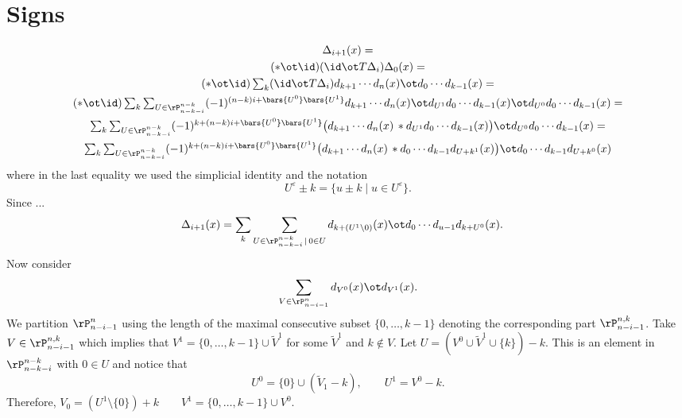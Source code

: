 
\section{Signs}

\begin{gather*}
	\Delta_{i+1}(x) = \\
	(\ast \ot \id)(\id \ot T\Delta_i) \Delta_0(x) = \\
	(\ast \ot \id) \textstyle\sum_k (\id \ot T\Delta_i) d_{k+1} \dotsm d_n(x) \ot d_{0} \dotsm d_{k-1}(x) = \\
	(\ast \ot \id)\textstyle\sum_k \sum_{U \in \rP^{n-k}_{n-k-i}} (-1)^{(n-k)i+\bars{U^0}\bars{U^1}} d_{k+1} \dotsm d_n(x) \ot d_{U^1} d_{0} \dotsm d_{k-1}(x) \ot d_{U^0} d_{0} \dotsm d_{k-1}(x) = \\
	\textstyle\sum_k \sum_{U \in \rP^{n-k}_{n-k-i}} (-1)^{k+(n-k)i+\bars{U^0}\bars{U^1}} \big( d_{k+1} \dotsm d_n(x) \, \ast d_{U^1} d_{0} \dotsm d_{k-1}(x) \big) \ot d_{U^0} d_{0} \dotsm d_{k-1}(x) = \\
	\textstyle\sum_k \sum_{U \in \rP^{n-k}_{n-k-i}} (-1)^{k+(n-k)i+\bars{U^0}\bars{U^1}} \big( d_{k+1} \dotsm d_n(x) \, \ast d_{0} \dotsm d_{k-1} d_{U+k^1}(x) \big) \ot d_{0} \dotsm d_{k-1} d_{U+k^0}(x)
\end{gather*}
where in the last equality we used the simplicial identity and the notation
\[
U^\varepsilon \pm k = \{u \pm k \mid u \in U^\varepsilon\}.
\]
Since ...
\begin{align*}
	\Delta_{i+1}(x) &=
	\sum_k \sum_{U \in \rP^{n-k}_{n-k-i} \,|\, 0 \in U} d_{k+(U^1 \setminus 0)}(x) \ot d_{0} \dotsm d_{u-1} d_{k+U^0}(x).
\end{align*}
Now consider
\[
\sum_{V \in \rP^{n}_{n-i-1}} d_{V^0}(x) \ot d_{V^1}(x).
\]
We partition $\rP^{n}_{n-i-1}$ using the length of the maximal consecutive subset $\{0,\dots,k-1\}$ denoting the corresponding part $\rP^{n,k}_{n-i-1}$.
Take $V \in \rP^{n,k}_{n-i-1}$ which implies that $V^1 = \{0,\dots,k-1\} \cup \widetilde V^1$ for some $\widetilde V^1$ and $k \notin V$.
Let $U = (V^0 \cup \widetilde V^1 \cup \{k\})-k$.
This is an element in $\rP^{n-k}_{n-k-i}$ with $0 \in U$ and notice that
\[
U^0 = \{0\} \cup (\widetilde V_1-k),
\qquad
U^1 = V^0-k.
\]
Therefore,
$V_0 = (U^1 \setminus \{0\})+k
\qquad
V^1 = \{0,\dots,k-1\} \cup V^0$.